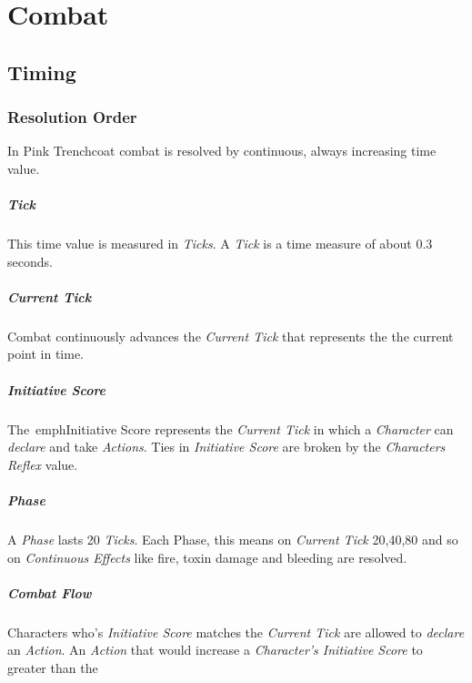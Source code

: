 \chapter{Combat}

\section{Timing}

\subsection{Resolution Order}

In Pink Trenchcoat combat is resolved by continuous, always increasing time value.

\paragraph{Tick}
This time value is measured in \emph{Ticks}. A \emph{Tick} is
a time measure of about 0.3 seconds.

\paragraph{Current Tick}
Combat continuously advances the \emph{Current Tick} that represents the the current
point in time.

\paragraph{Initiative Score}
The\ emph{Initiative Score} represents the \emph{Current Tick} in which a
\emph{Character} can \emph{declare} and take \emph{Actions}.
Ties in \emph{Initiative Score} are broken by the \emph{Characters Reflex} value.

\paragraph{Phase}
A \emph{Phase} lasts 20 \emph{Ticks}. Each Phase, this means on \emph{Current Tick }
20,40,80 and so on \emph{Continuous Effects} like fire,
toxin damage and bleeding are resolved.

\paragraph{Combat Flow}
Characters who's \emph{Initiative Score} matches the \emph{Current Tick}
are allowed to \emph{declare} an \emph{Action}. An \emph{Action} that would
increase a \emph{Character's Initiative Score} to greater than the

